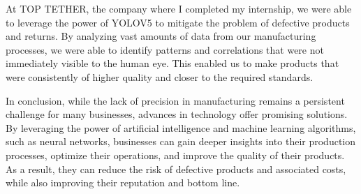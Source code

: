 At TOP TETHER, the company where I completed my internship, we were able to leverage the power of YOLOV5  to mitigate the problem of defective products and returns. By analyzing vast amounts of data from our manufacturing processes, we were able to identify patterns and correlations that were not immediately visible to the human eye. This enabled us to make products that were consistently of higher quality and closer to the required standards.


In conclusion, while the lack of precision in manufacturing remains a persistent challenge for many businesses, advances in technology offer promising solutions. By leveraging the power of artificial intelligence and machine learning algorithms, such as neural networks, businesses can gain deeper insights into their production processes, optimize their operations, and improve the quality of their products. As a result, they can reduce the risk of defective products and associated costs, while also improving their reputation and bottom line.

\newpage

%
